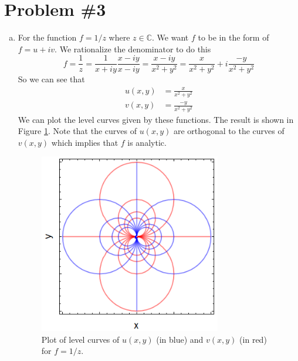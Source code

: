 \documentclass[11pt]{article}
\numberwithin{equation}{section}
\begin{document}
\pagebreak

\section{Problem \#3}
\begin{enumerate}[(a)]
\item For the function $f=1/z$ where $z\in\mathbb{C}$. We want $f$ to be in the form of 
$f = u+iv$. We rationalize the denominator to do this
$$f= \frac{1}{z} = \frac{1}{x+iy}\frac{x-iy}{x-iy} = \frac{x-iy}{x^2+y^2} = \frac{x}{x^2+y^2} + i\frac{-y}{x^2+y^2}$$
So we can see that 
\begin{align*}
u(x,y) &= \frac{x}{x^2+y^2}\\
v(x,y) &= \frac{-y}{x^2+y^2}
\end{align*}
We can plot the level curves given by these functions. The result is shown in Figure 
\ref{Fig1}. Note that the curves of $u(x,y)$ are orthogonal to the curves of $v(x,y)$ which
implies that $f$ is analytic.
\begin{figure}
\centering
\includegraphics[width=0.75\textwidth]{Figure1.png}
\caption{Plot of level curves of $u(x,y)$ (in blue) and $v(x,y)$ (in red) for $f=1/z$.}
\label{Fig1}
\end{figure}


\end{enumerate}
\end{document}
